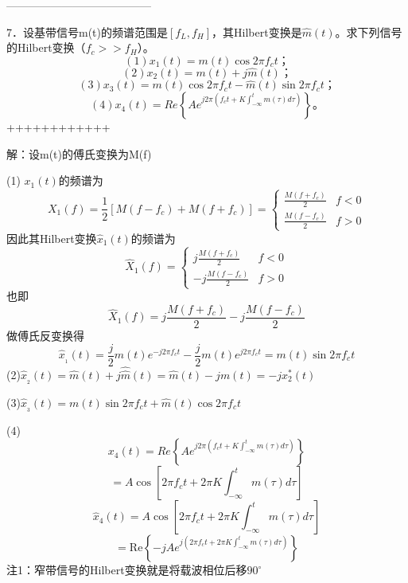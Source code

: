 \documentclass[utf8]{article}
\begin{document}
---------------------------------------

7．设基带信号m(t)的频谱范围是$\left[ f_{L},f_{H} \right]$，其Hilbert变换是$\hat{m} \left( t \right)$。求下列信号的Hilbert变换（$f_{c}>>f_{H}$）。
$$\left( 1 \right) x_{1} \left( t \right)=m \left( t \right) \cos 2 \pi f_{c}t；$$
$$\left( 2 \right) x_{2} \left( t \right)=m \left( t \right)+j \hat{m} \left( t \right)；$$
$$\left(3 \right) x_{3} \left( t \right)=m \left( t \right) \cos 2 \pi f_{c}t- \hat{m} \left( t \right) \sin 2 \pi f_{c}t；$$
$$\left( 4 \right) x_{4} \left( t \right)=Re \left \{ Ae^{j2 \pi \left( f_{c}t+K \int_{- \infty}^{t}m \left( \tau \right) d \tau \right)} \right \}。$$
++++++++++++

解：设m(t)的傅氏变换为M(f)

(1) $x_{1}(t)$的频谱为 
$$X_{1} \left( f \right)= \frac{1}{2} \left[ M \left( f-f_{c} \right)+M \left( f+f_{c} \right) \right]= \left \{ \begin{matrix} \frac{M \left( f+f_{c} \right)}{2}&f<0 \\ \frac{M \left( f-f_{c} \right)}{2}&f>0 \end{matrix} \right.$$
因此其Hilbert变换$\hat{x}_{1} \left( t \right)$的频谱为
$$\hat{X}_{1} \left( f \right)= \left \{ \begin{matrix} j \frac{M \left( f+f_{c} \right)}{2}&f<0 \\ -j \frac{M \left( f-f_{c} \right)}{2}&f>0 \end{matrix} \right.$$
也即
$$\hat{X}_{1} \left( f \right)=j \frac{M \left( f+f_{c} \right)}{2}-j \frac{M \left( f-f_{c} \right)}{2}$$
做傅氏反变换得
$$\widehat{x}_{{}_{1}} \left( t \right)= \frac{j}{2}m \left( t \right) e^{-j2 \pi f_{c}t}- \frac{j}{2}m \left( t \right) e^{j2 \pi f_{c}t}=m \left( t \right) \sin 2 \pi f_{c}t$$
(2)$\hat{x}_{{}_{2}} \left( t \right)= \hat{m} \left( t \right)+j \hat{ \hat{m}} \left( t \right)= \hat{m} \left( t \right)-jm \left( t \right)=-jx_{2}^{*} \left( t \right)$

(3)$\hat{x}_{{}_{3}} \left( t \right)=m \left( t \right) \sin 2 \pi f_{c}t+ \hat{m} \left( t \right) \cos 2 \pi f_{c}t$

(4)
$$x_{4} \left(t \right)=Re \left \{ Ae^{j2 \pi \left(f_{c}t+K \int_{- \infty}^{t}m \left( \tau \right) d \tau \right)} \right \}$$
$$=A \cos \left[ 2 \pi f_{c}t+2 \pi K \int_{- \infty}^{t}m \left( \tau \right) d \tau \right]$$
$$\hat{x}_{4} \left(t \right)=A \cos \left[ 2 \pi f_{c}t+2 \pi K \int_{- \infty}^{t}m \left( \tau \right) d \tau \right]$$
$$= \mathrm{Re}\left\{-jAe^{j\left(2\pi f_{c}t+2\pi K\int_{-\infty}^ {t}m\left(\tau\right)d\tau\right)}\right\}$$
注1：窄带信号的Hilbert变换就是将载波相位后移$90^{ \circ}$
\end{document}
